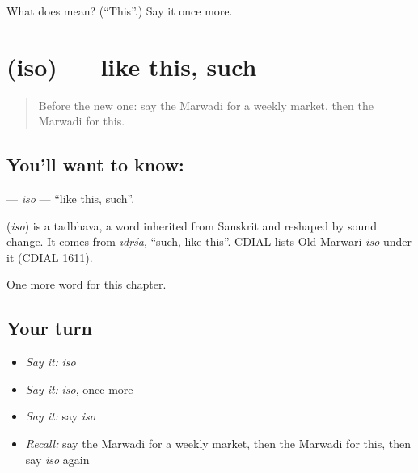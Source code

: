 \begin{tcolorbox}[breakable,colback=teal!4,colframe=teal!35!black,title={Before you move on}]
What does  mean? (\textquotedblleft{}This\textquotedblright{}.) Say it once more.
\end{tcolorbox}
\section[\texorpdfstring{\mw{इसो} (iso)}{इसो (iso)}]{ (iso) — like this, such}

\label{lesson:MW-C101-iso}



\begin{quote}
Before the new one: say the Marwadi for a weekly market, then the Marwadi for this.
\end{quote}

\subsection*{You'll want to know: }
\textbf{} — \emph{iso} — \textquotedblleft{}like this, such\textquotedblright{}.

\begin{cousinweb}
\textbf{} (\emph{iso}) is a tadbhava, a word inherited from Sanskrit and reshaped by sound change. It comes from \emph{īdṛśa}, \textquotedblleft{}such, like this\textquotedblright{}. CDIAL lists Old Marwari \emph{iso} under it (CDIAL 1611).
\end{cousinweb}

\begin{grammarlens}[title={What you've built}]
One more word for this chapter.
\end{grammarlens}

\subsection*{Your turn}
\begin{itemize}
\raggedright
  \item \emph{Say it:} \emph{iso}
  \item \emph{Say it:} \emph{iso}, once more
  \item \emph{Say it:} say \emph{iso}
  \item \emph{Recall:} say the Marwadi for a weekly market, then the Marwadi for this, then say \emph{iso} again
\end{itemize}

